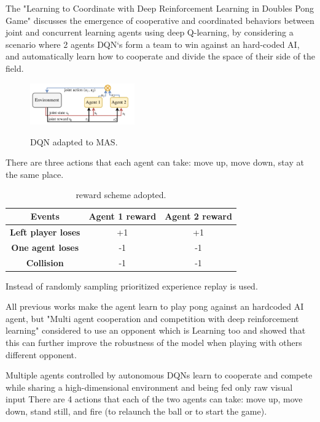 The "Learning to Coordinate with Deep Reinforcement Learning in Doubles Pong Game" discusses the emergence of cooperative and coordinated behaviors between joint and concurrent learning
agents using deep Q-learning, by considering a scenario where 2 agents DQN`s form a team to win against an hard-coded AI,
and automatically learn how to cooperate and divide the space of their side of the field.

\begin{figure}[ht]
  \centering
  \includegraphics[width=0.4\textwidth]{images/DQN_MAS.png}
  \label{dqnmas}
  \caption{DQN adapted to MAS.}
\end{figure}

There are three actions that each agent can take: move up, move down, stay at the same place.

\begin{table}[ht]
  \centering
  \begin{tabular}{@{}ccc@{}}
    \toprule
    \textbf{Events}            & \textbf{Agent 1 reward} & \textbf{Agent 2 reward} \\ \midrule
    \textbf{Left player loses} & +1                      & +1                      \\
    \textbf{One agent loses}   & -1                      & -1                      \\
    \textbf{Collision}         & -1                      & -1                      \\ \bottomrule
  \end{tabular}
  \label{my-table}
  \caption{reward scheme adopted.}
\end{table}

Instead of randomly sampling prioritized experience replay is used.




All previous works make the agent learn to play pong against an hardcoded AI agent, but "Multi agent cooperation and competition with deep reinforcement learning" considered to use an opponent
which is Learning too and showed that this can further improve the robustness of the model when playing with others different opponent.

Multiple agents controlled by autonomous DQNs learn to cooperate and compete while sharing a high-dimensional environment and being fed only raw visual input
There are 4 actions that each of the two agents can take: move up, move down, stand still, and fire (to relaunch the ball or to start the game).

